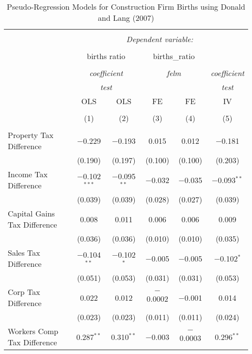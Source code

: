
\begin{table}[!htbp] \centering 
  \caption{Pseudo-Regression Models for  Construction Firm Births using Donald and Lang (2007)} 
  \label{} 
\begin{tabular}{@{\extracolsep{5pt}}lccccc} 
\\[-1.8ex]\hline 
\hline \\[-1.8ex] 
 & \multicolumn{5}{c}{\textit{Dependent variable:}} \\ 
\cline{2-6} 
\\[-1.8ex] & \multicolumn{2}{c}{births ratio} & \multicolumn{2}{c}{births\_ratio} &   \\ 
\\[-1.8ex] & \multicolumn{2}{c}{\textit{coefficient}} & \multicolumn{2}{c}{\textit{felm}} & \textit{coefficient} \\ 
 & \multicolumn{2}{c}{\textit{test}} & \multicolumn{2}{c}{\textit{}} & \textit{test} \\ 
 & OLS & OLS & FE & FE & IV \\ 
\\[-1.8ex] & (1) & (2) & (3) & (4) & (5)\\ 
\hline \\[-1.8ex] 
 Property Tax Difference & $-$0.229 & $-$0.193 & 0.015 & 0.012 & $-$0.181 \\ 
  & (0.190) & (0.197) & (0.100) & (0.100) & (0.203) \\ 
  Income Tax Difference & $-$0.102$^{***}$ & $-$0.095$^{**}$ & $-$0.032 & $-$0.035 & $-$0.093$^{**}$ \\ 
  & (0.039) & (0.039) & (0.028) & (0.027) & (0.039) \\ 
  Capital Gains Tax Difference & 0.008 & 0.011 & 0.006 & 0.006 & 0.009 \\ 
  & (0.036) & (0.036) & (0.010) & (0.010) & (0.035) \\ 
  Sales Tax Difference & $-$0.104$^{**}$ & $-$0.102$^{*}$ & $-$0.005 & $-$0.005 & $-$0.102$^{*}$ \\ 
  & (0.051) & (0.053) & (0.031) & (0.031) & (0.053) \\ 
  Corp Tax Difference & 0.022 & 0.012 & $-$0.0002 & $-$0.001 & 0.014 \\ 
  & (0.023) & (0.023) & (0.011) & (0.011) & (0.024) \\ 
  Workers Comp Tax Difference & 0.287$^{**}$ & 0.310$^{**}$ & $-$0.003 & $-$0.0003 & 0.296$^{**}$ \\ 

\end{tabular}
\end{table}
